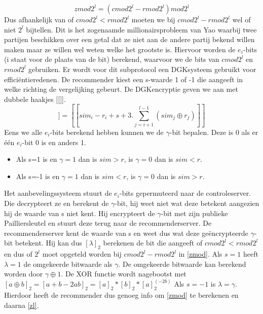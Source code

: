 \begin{equation}
\label{zmod}zmod2^l = (cmod2^l - rmod2^l)mod2^l \end{equation}
Dus afhankelijk van of $cmod2^l < rmod2^l$ moeten we bij $cmod2^l - rmod2^l$ wel of niet $2^l$ bijtellen. Dit is het zogenaamde millionairsprobleem van Yao waarbij twee partijen beschikken over een getal dat ze niet aan de andere partij bekend willen maken maar ze willen wel weten welke het grootste is. Hiervoor worden de $e_i$-bits (i staat voor de plaats van de bit) berekend, waarvoor we de bits van $cmod2^l$ en $rmod2^l$ gebruiken. Er wordt voor dit subprotocol een DGKsysteem gebruikt voor effici\"entieredenen.  De recommender kiest een s-waarde 1 of -1 die aangeeft in welke richting de vergelijking gebeurt. De DGKencryptie geven we aan met dubbele haakjes [[]].
\begin{equation}
[[e_i]]=[[sim_i - r_i + s+ 3.\sum_{j=i+1}^{l-1}(sim_j \oplus r_j)]]
\end{equation}
Eens we alle $e_i$-bits berekend hebben kunnen we de $\gamma$-bit bepalen. Deze is 0 als er één $e_i$-bit 0 is en anders 1.
\begin{itemize}
 
\item Als s=1 is en $\gamma = 1$  dan is $sim > r$, is $\gamma=0$ dan is $sim< r$.
\item  Als s=-1 is en $\gamma = 1$  dan is $sim < r$, is $\gamma=0$ dan is $sim> r$.
\end{itemize}   Het aanbevelingssysteem stuurt de $e_i$-bits gepermuteerd naar de controleserver. Die decrypteert ze en berekent de $\gamma$-bit, hij weet niet wat deze betekent aangezien hij de waarde van s niet kent. Hij encrypteert de $\gamma$-bit met zijn publieke Pailliersleutel en stuurt deze terug naar de recommenderserver. De recommenderserver kent de waarde van s en weet dus wat deze ge\"encrypteerde $\gamma$-bit betekent. Hij kan dus $[\lambda]_2$ berekenen de bit die aangeeft of $cmod2^l < rmod2^l$ en dus of $2^l$ moet opgeteld worden bij $cmod2^l - rmod2^l$ in \ref{zmod}.
Als $s = 1$ heeft  $\lambda=1$ de omgekeerde bitwaarde als $\gamma$. De omgekeerde bitwaarde kan berekend worden door  $\gamma \oplus 1$. De XOR functie wordt nagebootst met $[a \oplus b]_2= [a + b - 2ab]_2 = [a]_2*[b]_2*[a]_2^(-2b)$ Als $s =-1$ is $\lambda = \gamma$. Hierdoor heeft de recommender dus genoeg info om \ref{zmod} te berekenen en daarna \ref{zl}.
